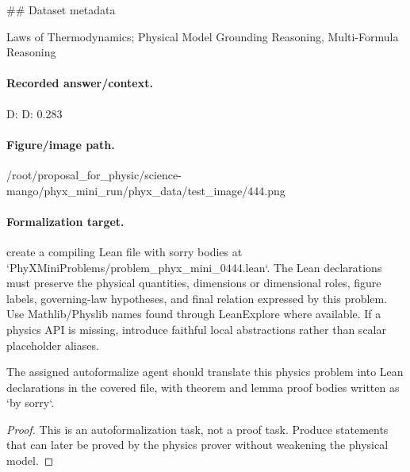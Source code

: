 \#\# Dataset metadata

Laws of Thermodynamics; Physical Model Grounding Reasoning, Multi-Formula Reasoning

\paragraph{Recorded answer/context.}
D: D: 0.283

\paragraph{Figure/image path.}
/root/proposal\_for\_physic/science-mango/phyx\_mini\_run/phyx\_data/test\_image/444.png

\paragraph{Formalization target.}
create a compiling Lean file with sorry bodies at `PhyXMiniProblems/problem\_phyx\_mini\_0444.lean`. The Lean declarations must preserve the physical quantities, dimensions or dimensional roles, figure labels, governing-law hypotheses, and final relation expressed by this problem.
Use Mathlib/Physlib names found through LeanExplore where available. If a physics API is missing, introduce faithful local abstractions rather than scalar placeholder aliases.

\begin{theorem}
\label{thm:physics:phyx_mini_0444:target}
The assigned autoformalize agent should translate this physics problem into Lean declarations in the covered file, with theorem and lemma proof bodies written as `by sorry`.
\end{theorem}
\begin{proof}
This is an autoformalization task, not a proof task. Produce statements that can later be proved by the physics prover without weakening the physical model.
\end{proof}

